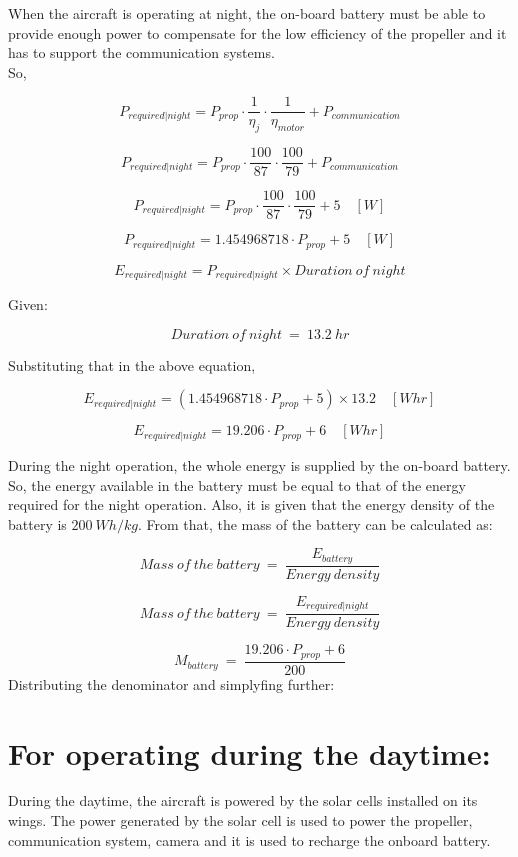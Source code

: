 \p When the aircraft is operating at night, the on-board battery must be able to provide enough power to compensate for the low efficiency of the propeller and it has to support the communication systems. \\

\p So,

\[
P_{required | night} = P_{prop} \cdot \frac{1}{\eta_j} \cdot \frac{1}{\eta_{motor}} + P_{communication}
\]

\[
P_{required | night} = P_{prop} \cdot \frac{100}{87} \cdot \frac{100}{79} + P_{communication}
\]

\[
P_{required | night} = P_{prop} \cdot \frac{100}{87} \cdot \frac{100}{79} + 5 \quad [W]
\]

\[
P_{required | night} = 1.454968718 \cdot P_{prop} + 5 \quad [W]
\]

\[
E_{required | night} = P_{required | night} \times Duration \ of \ night
\]

Given:

\[
Duration \ of \ night \ = \ 13.2 \ hr
\]

Substituting that in the above equation,

\[
E_{required | night} = (1.454968718 \cdot P_{prop} + 5) \times 13.2 \quad [Whr]
\]

\[
E_{required | night} = 19.206 \cdot P_{prop} + 6 \quad [Whr]
\]


\p During the night operation, the whole energy is supplied by the on-board battery. So, the energy available in the battery must be equal to that of the energy required for the night operation. Also, it is given that the energy density of the battery is $ 200 \ Wh/kg $. From that, the mass of the battery can be calculated as:

\[
Mass \ of \ the \ battery \ = \ \frac{ E_{battery} }{ Energy \ density }
\]

\[
Mass \ of \ the \ battery \ = \ \frac{ E_{required | night} }{ Energy \ density }
\]

\[
M_{battery} \ = \ \frac{ 19.206 \cdot P_{prop} + 6 }{ 200 }
\]
Distributing the denominator and simplyfing further:

\section{For operating during the daytime:}

\p During the daytime, the aircraft is powered by the solar cells installed on its wings. The power generated by the solar cell is used to power the propeller, communication system, camera and it is used to recharge the onboard battery. \\

